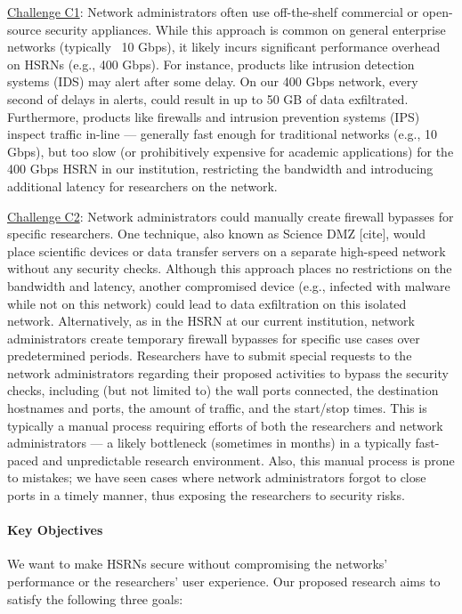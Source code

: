 \underline{Challenge C1}: Network administrators often use off-the-shelf commercial or open-source security appliances. While this approach is common on general enterprise networks (typically ~10 Gbps), it likely incurs significant performance overhead on HSRNs (e.g., 400 Gbps). For instance, products like intrusion detection systems (IDS) may alert after some delay. On our 400 Gbps network, every second of delays in alerts, could result in up to 50 GB of data exfiltrated. Furthermore, products like firewalls and intrusion prevention systems (IPS) inspect traffic in-line — generally fast enough for traditional networks (e.g., 10 Gbps), but too slow (or prohibitively expensive for academic applications) for the 400 Gbps HSRN in our institution, restricting the bandwidth and introducing additional latency for researchers on the network.

\underline{Challenge C2}: Network administrators could manually create firewall bypasses for specific researchers. One technique, also known as Science DMZ [cite], would place scientific devices or data transfer servers on a separate high-speed network without any security checks. Although this approach places no restrictions on the bandwidth and latency, another compromised device (e.g., infected with malware while not on this network) could lead to data exfiltration on this isolated network. Alternatively, as in the HSRN at our current institution, network administrators create temporary firewall bypasses for specific use cases over predetermined periods. Researchers have to submit special requests to the network administrators regarding their proposed activities to bypass the security checks, including (but not limited to) the wall ports connected, the destination hostnames and ports, the amount of traffic, and the start/stop times. This is typically a manual process requiring efforts of both the researchers and network administrators — a likely bottleneck (sometimes in months) in a typically fast-paced and unpredictable research environment. Also, this manual process is prone to mistakes; we have seen cases where network administrators forgot to close ports in a timely manner, thus exposing the researchers to security risks.

\paragraph{Key Objectives}
We want to make HSRNs secure without compromising the networks' performance or the researchers' user experience. Our proposed research aims to satisfy the following three goals:

